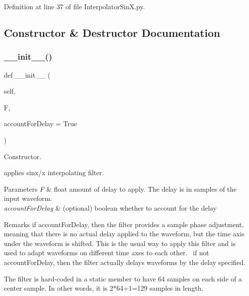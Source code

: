 Definition at line 37 of file Interpolator\+Sin\+X.\+py.



\subsection{Constructor \& Destructor Documentation}
\mbox{\label{classSignalIntegrity_1_1TimeDomain_1_1Filters_1_1InterpolatorSinX_1_1FractionalDelayFilterSinX_a71162faa904c7ea2018b89ebba16c33d}} 
\subsubsection{\texorpdfstring{\+\_\+\+\_\+init\+\_\+\+\_\+()}{\_\_init\_\_()}}
{\footnotesize\ttfamily def \+\_\+\+\_\+init\+\_\+\+\_\+ (\begin{DoxyParamCaption}\item[{}]{self,  }\item[{}]{F,  }\item[{}]{account\+For\+Delay = {\ttfamily True} }\end{DoxyParamCaption})}



Constructor. 

applies sinx/x interpolating filter.


\begin{DoxyParams}{Parameters}
{\em F} & float amount of delay to apply. The delay is in samples of the input waveform. \\
\hline
{\em account\+For\+Delay} & (optional) boolean whether to account for the delay \\
\hline
\end{DoxyParams}
\begin{DoxyRemark}{Remarks}
if account\+For\+Delay, then the filter provides a sample phase adjustment, meaning that there is no actual delay applied to the waveform, but the time axis under the waveform is shifted. This is the usual way to apply this filter and is used to adapt waveforms on different time axes to each other.~\newline
 if not account\+For\+Delay, then the filter actually delays waveforms by the delay specified. 

The filter is hard-\/coded in a static member to have 64 samples on each side of a center sample. In other words, it is 2$\ast$64+1=129 samples in length. 
\end{DoxyRemark}


